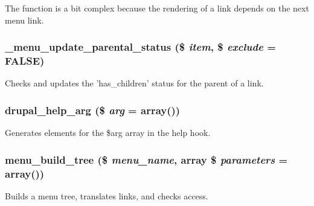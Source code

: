 The function is a bit complex because the rendering of a link depends on the next menu link. \hypertarget{group__menu_ga9df6c2183ab9ee0e934eec54a67761d8}{
\subsubsection[{\_\-menu\_\-update\_\-parental\_\-status}]{\setlength{\rightskip}{0pt plus 5cm}\_\-menu\_\-update\_\-parental\_\-status (\$ {\em item}, \/  \$ {\em exclude} = {\ttfamily FALSE})}}
\label{group__menu_ga9df6c2183ab9ee0e934eec54a67761d8}
Checks and updates the 'has\_\-children' status for the parent of a link. \hypertarget{group__menu_ga00dce79e81030a75c94c7a279794b253}{
\subsubsection[{drupal\_\-help\_\-arg}]{\setlength{\rightskip}{0pt plus 5cm}drupal\_\-help\_\-arg (\$ {\em arg} = {\ttfamily array()})}}
\label{group__menu_ga00dce79e81030a75c94c7a279794b253}
Generates elements for the \$arg array in the help hook. \hypertarget{group__menu_gabd17638ed8a36d5412244fd7c2456eb7}{
\subsubsection[{menu\_\-build\_\-tree}]{\setlength{\rightskip}{0pt plus 5cm}menu\_\-build\_\-tree (\$ {\em menu\_\-name}, \/  array \$ {\em parameters} = {\ttfamily array()})}}
\label{group__menu_gabd17638ed8a36d5412244fd7c2456eb7}
Builds a menu tree, translates links, and checks access.


